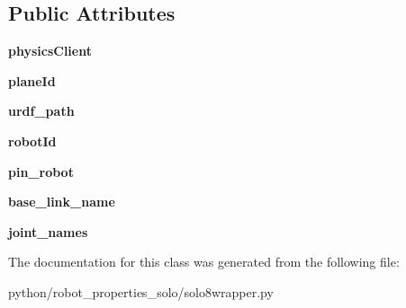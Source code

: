 \subsection*{Public Attributes}
\begin{DoxyCompactItemize}
\item 
{\bfseries physics\+Client}\hypertarget{classrobot__properties__solo_1_1solo8wrapper_1_1Solo8Robot_af82fb3fc2b4f8a60353bb8ff96713fd7}{}\label{classrobot__properties__solo_1_1solo8wrapper_1_1Solo8Robot_af82fb3fc2b4f8a60353bb8ff96713fd7}

\item 
{\bfseries plane\+Id}\hypertarget{classrobot__properties__solo_1_1solo8wrapper_1_1Solo8Robot_aae39d72dbc2fb10f4809cf1f55edb993}{}\label{classrobot__properties__solo_1_1solo8wrapper_1_1Solo8Robot_aae39d72dbc2fb10f4809cf1f55edb993}

\item 
{\bfseries urdf\+\_\+path}\hypertarget{classrobot__properties__solo_1_1solo8wrapper_1_1Solo8Robot_a43aff6849cbb3535a0cece77ef41b383}{}\label{classrobot__properties__solo_1_1solo8wrapper_1_1Solo8Robot_a43aff6849cbb3535a0cece77ef41b383}

\item 
{\bfseries robot\+Id}\hypertarget{classrobot__properties__solo_1_1solo8wrapper_1_1Solo8Robot_a38b69aeb9598f0261afdb96b531a26bc}{}\label{classrobot__properties__solo_1_1solo8wrapper_1_1Solo8Robot_a38b69aeb9598f0261afdb96b531a26bc}

\item 
{\bfseries pin\+\_\+robot}\hypertarget{classrobot__properties__solo_1_1solo8wrapper_1_1Solo8Robot_a00db0b1bfe4e0bb7e09faa3ab174eb53}{}\label{classrobot__properties__solo_1_1solo8wrapper_1_1Solo8Robot_a00db0b1bfe4e0bb7e09faa3ab174eb53}

\item 
{\bfseries base\+\_\+link\+\_\+name}\hypertarget{classrobot__properties__solo_1_1solo8wrapper_1_1Solo8Robot_ae67c30be8142a5387d0b89e10c617b76}{}\label{classrobot__properties__solo_1_1solo8wrapper_1_1Solo8Robot_ae67c30be8142a5387d0b89e10c617b76}

\item 
{\bfseries joint\+\_\+names}\hypertarget{classrobot__properties__solo_1_1solo8wrapper_1_1Solo8Robot_a802f51847eecd38bbf0153087e0c59a1}{}\label{classrobot__properties__solo_1_1solo8wrapper_1_1Solo8Robot_a802f51847eecd38bbf0153087e0c59a1}

\end{DoxyCompactItemize}


The documentation for this class was generated from the following file\+:\begin{DoxyCompactItemize}
\item 
python/robot\+\_\+properties\+\_\+solo/solo8wrapper.\+py\end{DoxyCompactItemize}
